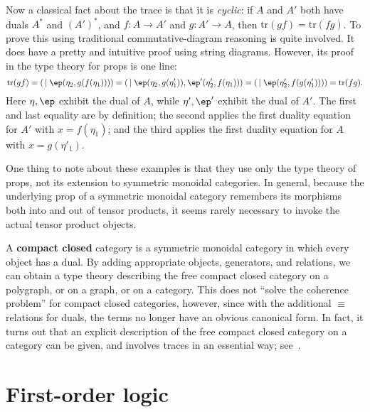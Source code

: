\documentclass{book}
\def\tr{\mathrm{tr}}
\begin{document}
Now a classical fact about the trace is that it is \emph{cyclic}: if $A$ and $A'$ both have duals $A^*$ and $(A')^*$, and $f:A\to A'$ and $g:A'\to A$, then $\tr(gf) = \tr(fg)$.
To prove this using traditional commutative-diagram reasoning is quite involved.
It does have a pretty and intuitive proof using string diagrams.
However, its proof in the type theory for props is one line:
\[ \tr(gf) = (\,\mid \ep(\eta_2,g(f(\eta_1))))
= (\,\mid \ep(\eta_2,g(\eta'_1)),\ep'(\eta'_2,f(\eta_1)))
= (\,\mid \ep(\eta'_2,f(g(\eta'_1))))
= \tr(fg).
\]
Here $\eta,\ep$ exhibit the dual of $A$, while $\eta',\ep'$ exhibit the dual of $A'$.
The first and last equality are by definition;
the second applies the first duality equation for $A'$ with $x=f(\eta_1)$; and the third applies the first duality equation for $A$ with $x=g(\eta'_1)$.

One thing to note about these examples is that they use only the type theory of props, not its extension to symmetric monoidal categories.
In general, because the underlying prop of a symmetric monoidal category remembers its morphisms both into and out of tensor products, it seems rarely necessary to invoke the actual tensor product objects.

\begin{rmk}
  A \textbf{compact closed} category is a symmetric monoidal category in which every object has a dual.
  By adding appropriate objects, generators, and relations, we can obtain a type theory describing the free compact closed category on a polygraph, or on a graph, or on a category.
  This does not ``solve the coherence problem'' for compact closed categories, however, since with the additional $\equiv$ relations for duals, the terms no longer have an obvious canonical form.
  In fact, it turns out that an explicit description of the free compact closed category on a category can be given, and involves traces in an essential way; see~\cite{kl:cpt}.
\end{rmk}


\chapter{First-order logic}
\label{chap:fol}






\end{document}
